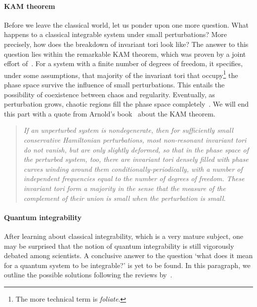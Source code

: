 \paragraph{KAM theorem}Before we leave the classical world, let us ponder upon one more question.
What happens to a classical integrable system under small perturbations? More precisely,
how does the breakdown of invariant tori look like? The answer to this question lies
within the remarkable KAM theorem, which was proven by a joint effort
of~\textcite{Kolmogorov1954,Moser1962,Arnold1963}. For
a system with a finite number of degrees of freedom, it specifies, under some assumptions,
that majority of the invariant tori that occupy\footnote{The more technical term is
\textit{foliate}.} the phase space survive the influence of small perturbations. This entails
the possibility of coexistence between chaos and regularity. Eventually, as perturbation grows,
chaotic regions fill the phase space completely~\autocite{DAlessio2016}. We will end this part
with a quote from Arnold's book~\autocite{arnold2013mathematical} about the KAM theorem.
\begin{quotation}
   \textit{ If an unperturbed system is nondegenerate, then for sufficiently
small conservative Hamiltonian perturbations, most non-resonant invariant
tori do not vanish, but are only slightly deformed, so that in the phase space
of the perturbed system, too, there are invariant tori densely filled with phase
curves winding around them conditionally-periodically, with a number of
independent frequencies equal to the number of degrees of freedom.
These invariant tori form a majority in the sense that the measure of the
complement of their union is small when the perturbation is small.}
\end{quotation}
\paragraph{Quantum integrability} After learning about classical integrability, which
is a very mature subject, one may be surprised that the notion of quantum integrability 
is still vigorously debated among scientists. A conclusive answer to the question
`what does it mean for a quantum system to be integrable?' is yet to be found.
In this paragraph, we outline the possible solutions following the reviews
by~\textcite{Caux2011,Yuzbashyan2013}.

